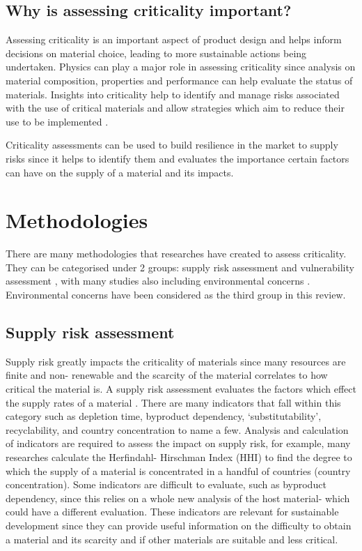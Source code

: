\documentclass{article}
\begin{document}
\subsection{Why is assessing criticality important?}

Assessing criticality is an important aspect of product design and helps inform decisions on material choice, leading to more sustainable actions being undertaken. Physics can play a major role in assessing criticality since analysis on material composition, properties and performance can help evaluate the status of materials. Insights into criticality help to identify and manage risks associated with the use of critical materials and allow strategies which aim to reduce their use to be implemented \cite{reller2011criticality}. 

Criticality assessments can be used to build resilience in the market to supply risks since it helps to identify them and evaluates the importance certain factors can have on the supply of a material and its impacts. 


\section{Methodologies}

There are many methodologies that researches have created to assess criticality. They can be categorised under 2 groups: supply risk assessment and vulnerability assessment \cite{gloser2015raw}, with many studies also including environmental concerns \cite{graedel2019defining}. Environmental concerns have been considered as the third group in this review. 

\subsection{Supply risk assessment}

Supply risk greatly impacts the criticality of materials since many resources are finite and non- renewable and the scarcity of the material correlates to how critical the material is. A supply risk assessment evaluates the factors which effect the supply rates of a material \cite{achzet2013evaluate}. There are many indicators that fall within this category such as depletion time, byproduct dependency, `substitutability', recyclability, and country concentration to name a few. Analysis and calculation of indicators are required to assess the impact on supply risk, for example, many researches calculate the Herfindahl- Hirschman Index (HHI) \cite{herfindahl1997concentration} to find the degree to which the supply of a material is concentrated in a handful of countries (country concentration). Some indicators are difficult to evaluate, such as byproduct dependency, since this relies on a whole new analysis of the host material- which could have a different evaluation. These indicators are relevant for sustainable development since they can provide useful information on the difficulty to obtain a material and its scarcity and if other materials are suitable and less critical. 
\end{document}
